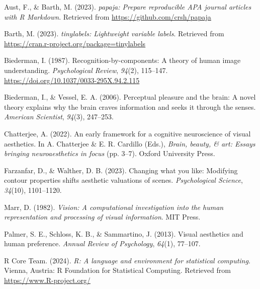 \documentclass[
  man,floatsintext]{apa6}
\newlength{\cslhangindent}
\newenvironment{CSLReferences}[2] %
 {\begin{list}{}{%
  \setlength{\itemindent}{0pt}
  \setlength{\leftmargin}{0pt}
  \setlength{\parsep}{0pt}
  \ifodd #1
   \setlength{\leftmargin}{\cslhangindent}
   \setlength{\itemindent}{-1\cslhangindent}
  \fi
  \setlength{\itemsep}{#2\baselineskip}}}
 {\end{list}}
\begin{document}
\label{refs}
\begin{CSLReferences}{1}{0}
Aust, F., \& Barth, M. (2023). \emph{{papaja}: {Prepare} reproducible {APA} journal articles with {R Markdown}}. Retrieved from \url{https://github.com/crsh/papaja}

Barth, M. (2023). \emph{{tinylabels}: Lightweight variable labels}. Retrieved from \url{https://cran.r-project.org/package=tinylabels}

Biederman, I. (1987). Recognition-by-components: A theory of human image understanding. \emph{Psychological Review}, \emph{94}(2), 115--147. \url{https://doi.org/10.1037/0033-295X.94.2.115}

Biederman, I., \& Vessel, E. A. (2006). Perceptual pleasure and the brain: A novel theory explains why the brain craves information and seeks it through the senses. \emph{American Scientist}, \emph{94}(3), 247--253.

Chatterjee, A. (2022). An early framework for a cognitive neuroscience of visual aesthetics. In A. Chatterjee \& E. R. Cardillo (Eds.), \emph{Brain, beauty, \& art: Essays bringing neuroaesthetics in focus} (pp. 3--7). Oxford University Press.

Farzanfar, D., \& Walther, D. B. (2023). Changing what you like: Modifying contour properties shifts aesthetic valuations of scenes. \emph{Psychological Science}, \emph{34}(10), 1101--1120.

Marr, D. (1982). \emph{Vision: A computational investigation into the human representation and processing of visual information}. MIT Press.

Palmer, S. E., Schloss, K. B., \& Sammartino, J. (2013). Visual aesthetics and human preference. \emph{Annual Review of Psychology}, \emph{64}(1), 77--107.

R Core Team. (2024). \emph{R: A language and environment for statistical computing}. Vienna, Austria: R Foundation for Statistical Computing. Retrieved from \url{https://www.R-project.org/}

\end{CSLReferences}

\newpage
\end{document}
